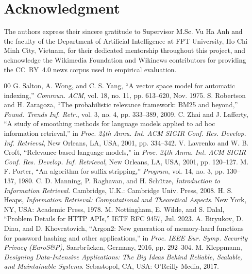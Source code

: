 \section*{Acknowledgment}
The authors express their sincere gratitude to Supervisor M.Sc. Vu Ha Anh and the faculty of the Department of Artificial Intelligence at FPT University, Ho Chi Minh City, Vietnam, for their dedicated mentorship throughout this project, and acknowledge the Wikimedia Foundation and Wikinews contributors for providing the CC~BY~4.0 news corpus used in empirical evaluation.

\begin{thebibliography}{00}
 G. Salton, A. Wong, and C. S. Yang, ``A vector space model for automatic indexing,'' \textit{Commun. ACM}, vol. 18, no. 11, pp. 613--620, Nov. 1975.
 S. Robertson and H. Zaragoza, ``The probabilistic relevance framework: BM25 and beyond,'' \textit{Found. Trends Inf. Retr.}, vol. 3, no. 4, pp. 333--389, 2009.
 C. Zhai and J. Lafferty, ``A study of smoothing methods for language models applied to ad hoc information retrieval,'' in \textit{Proc. 24th Annu. Int. ACM SIGIR Conf. Res. Develop. Inf. Retrieval}, New Orleans, LA, USA, 2001, pp. 334--342.
 V. Lavrenko and W. B. Croft, ``Relevance-based language models,'' in \textit{Proc. 24th Annu. Int. ACM SIGIR Conf. Res. Develop. Inf. Retrieval}, New Orleans, LA, USA, 2001, pp. 120--127.
 M. F. Porter, ``An algorithm for suffix stripping,'' \textit{Program}, vol. 14, no. 3, pp. 130--137, 1980.
 C. D. Manning, P. Raghavan, and H. Sch{\"u}tze, \textit{Introduction to Information Retrieval}. Cambridge, U.K.: Cambridge Univ. Press, 2008.
 H. S. Heaps, \textit{Information Retrieval: Computational and Theoretical Aspects}. New York, NY, USA: Academic Press, 1978.
 M. Nottingham, E. Wilde, and S. Dalal, ``Problem Details for HTTP APIs,'' IETF RFC 9457, Jul. 2023.
 A. Biryukov, D. Dinu, and D. Khovratovich, ``Argon2: New generation of memory-hard functions for password hashing and other applications,'' in \textit{Proc. IEEE Eur. Symp. Security Privacy (EuroS\&P)}, Saarbr{\"u}cken, Germany, 2016, pp. 292--304.
 M. Kleppmann, \textit{Designing Data-Intensive Applications: The Big Ideas Behind Reliable, Scalable, and Maintainable Systems}. Sebastopol, CA, USA: O'Reilly Media, 2017.
\end{thebibliography}


